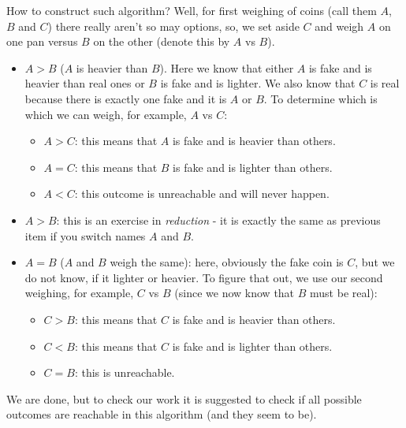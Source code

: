 \begin{problem}
How to construct such algorithm? Well, for first weighing of coins (call them $A$, $B$ and $C$) there  really aren't so may options, so, we set aside $C$ and weigh $A$ on one pan versus $B$ on the other (denote this by $A$ vs $B$). 
\begin{itemize}
\item $A>B$ ($A$ is heavier than $B$). Here we know that either $A$ is fake and is heavier than real ones or $B$ is fake and is lighter. We also know that $C$ is real because there is exactly one fake and it is $A$ or $B$. To determine which is which we can weigh, for example, $A$ vs $C$:
\begin{itemize}
\item $A>C$: this means that $A$ is fake and is heavier than others.   
\item $A=C$: this means that $B$ is fake and is lighter than others.   
\item $A<C$: this outcome is unreachable and will never happen.
\end{itemize}
\item $A>B$: this is an exercise in \textit{reduction} - it is exactly the same as previous item if you switch names $A$ and $B$.
\item $A=B$ ($A$ and $B$ weigh the same): here, obviously the fake coin is $C$, but we do not know, if it lighter or heavier. To figure that out, we use our second weighing, for example, $C$ vs $B$ (since we now know that $B$ must be real):
 \begin{itemize}
\item $C>B$: this means that $C$ is fake and is heavier than others.  
\item $C<B$: this means that $C$ is fake and is lighter than others.   
\item $C=B$: this is unreachable.
\end{itemize}
\end{itemize}

We are done, but to check our work it is suggested to check if all possible outcomes are reachable in this algorithm (and they seem to be).
\end{problem}
%
\filbreak

